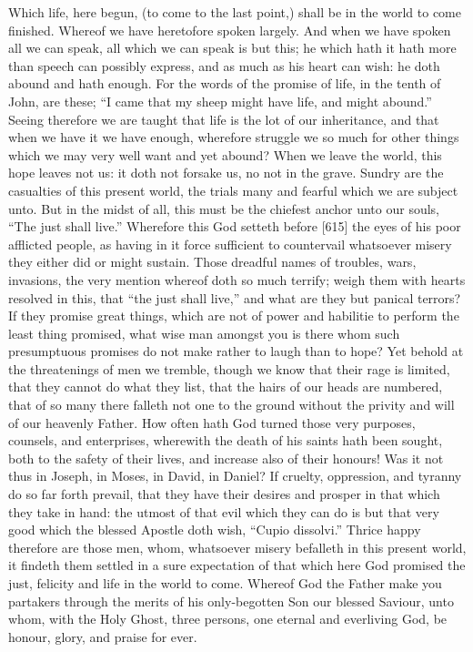 Which life, here begun, (to come to the last point,) shall be in the world to come finished. Whereof we have heretofore spoken largely. And when we have spoken all we can speak, all which we can speak is but this; he which hath it hath more than speech can possibly express, and as much as his heart can wish: he doth abound and hath enough. For the words of the promise of life, in the tenth of John, are these; “I came that my sheep might have life, and might abound.” Seeing therefore we are taught that life is the lot of our inheritance, and that when we have it we have enough, wherefore struggle we so much for other things which we may very well want and yet abound? When we leave the world, this hope leaves not us: it doth not forsake us, no not in the grave. Sundry are the casualties of this present world, the trials many and fearful which we are subject unto. But in the midst of all, this must be the chiefest anchor unto our souls, “The just shall live.” Wherefore this God setteth before [615] the eyes of his poor afflicted people, as having in it force sufficient to countervail whatsoever misery they either did or might sustain. Those dreadful names of troubles, wars, invasions, the very mention whereof doth so much terrify; weigh them with hearts resolved in this, that “the just shall live,” and what are they but panical terrors? If they promise great things, which are not of power and habilitie to perform the least thing promised, what wise man amongst you is there whom such presumptuous promises do not make rather to laugh than to hope? Yet behold at the threatenings of men we tremble, though we know that their rage is limited, that they cannot do what they list, that the hairs of our heads are numbered, that of so many there falleth not one to the ground without the privity and will of our heavenly Father. How often hath God turned those very purposes, counsels, and enterprises, wherewith the death of his saints hath been sought, both to the safety of their lives, and increase also of their honours! Was it not thus in Joseph, in Moses, in David, in Daniel? If cruelty, oppression, and tyranny do so far forth prevail, that they have their desires and prosper in that which they take in hand: the utmost of that evil which they can do is but that very good which the blessed Apostle doth wish, “Cupio dissolvi.” Thrice happy therefore are those men, whom, whatsoever misery befalleth in this present world, it findeth them settled in a sure expectation of that which here God promised the just, felicity and life in the world to come. Whereof God the Father make you partakers through the merits of his only-begotten Son our blessed Saviour, unto whom, with the Holy Ghost, three persons, one eternal and everliving God, be honour, glory, and praise for ever.

